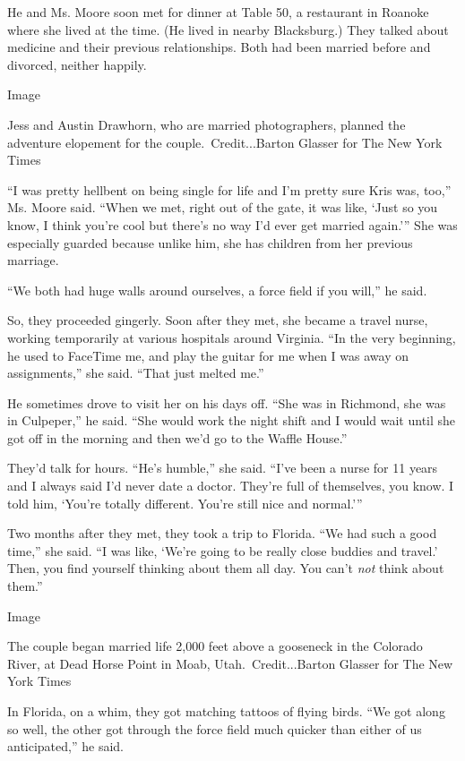 He and Ms. Moore soon met for dinner at Table 50, a restaurant in
Roanoke where she lived at the time. (He lived in nearby Blacksburg.)
They talked about medicine and their previous relationships. Both had
been married before and divorced, neither happily.

Image

Jess and Austin Drawhorn, who are married photographers, planned the
adventure elopement for the couple.~Credit...Barton Glasser for The New
York Times

``I was pretty hellbent on being single for life and I'm pretty sure
Kris was, too,'' Ms. Moore said. ``When we met, right out of the gate,
it was like, `Just so you know, I think you're cool but there's no way
I'd ever get married again.''' She was especially guarded because unlike
him, she has children from her previous marriage.

``We both had huge walls around ourselves, a force field if you will,''
he said.

So, they proceeded gingerly. Soon after they met, she became a travel
nurse, working temporarily at various hospitals around Virginia. ``In
the very beginning, he used to FaceTime me, and play the guitar for me
when I was away on assignments,'' she said. ``That just melted me.''

He sometimes drove to visit her on his days off. ``She was in Richmond,
she was in Culpeper,'' he said. ``She would work the night shift and I
would wait until she got off in the morning and then we'd go to the
Waffle House.''

They'd talk for hours. ``He's humble,'' she said. ``I've been a nurse
for 11 years and I always said I'd never date a doctor. They're full of
themselves, you know. I told him, `You're totally different. You're
still nice and normal.'''

Two months after they met, they took a trip to Florida. ``We had such a
good time,'' she said. ``I was like, `We're going to be really close
buddies and travel.' Then, you find yourself thinking about them all
day. You can't \emph{not} think about them.''

Image

The couple began married life 2,000 feet above a gooseneck in the
Colorado River, at Dead Horse Point in Moab, Utah.~Credit...Barton
Glasser for The New York Times

In Florida, on a whim, they got matching tattoos of flying birds. ``We
got along so well, the other got through the force field much quicker
than either of us anticipated,'' he said.

